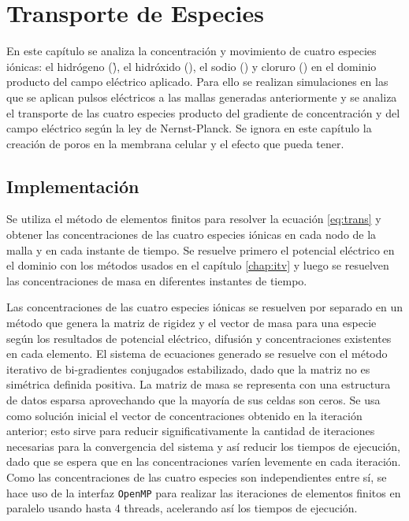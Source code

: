 \chapter{Transporte de Especies} \label{chap:trans}

En este capítulo se analiza la concentración y movimiento de cuatro especies iónicas: el hidrógeno (\h), el hidróxido (\oh), el sodio (\na) y cloruro (\cl) en el dominio producto del campo eléctrico aplicado. Para ello se realizan simulaciones en las que se aplican pulsos eléctricos a las mallas generadas anteriormente y se analiza el transporte de las cuatro especies producto del gradiente de concentración y del campo eléctrico según la ley de Nernst-Planck. Se ignora en este capítulo la creación de poros en la membrana celular y el efecto que pueda tener.

\section{Implementación}

Se utiliza el método de elementos finitos para resolver la ecuación \ref{eq:trans} y obtener las concentraciones de las cuatro especies iónicas en cada nodo de la malla y en cada instante de tiempo. Se resuelve primero el potencial eléctrico en el dominio con los métodos usados en el capítulo \ref{chap:itv} y luego se resuelven las concentraciones de masa en diferentes instantes de tiempo.

Las concentraciones de las cuatro especies iónicas se resuelven por separado en un método que genera la matriz de rigidez y el vector de masa para una especie según los resultados de potencial eléctrico, difusión y concentraciones existentes en cada elemento. El sistema de ecuaciones generado se resuelve con el método iterativo de bi-gradientes conjugados estabilizado, dado que la matriz no es simétrica definida positiva. La matriz de masa se representa con una estructura de datos esparsa aprovechando que la mayoría de sus celdas son ceros. Se usa como solución inicial el vector de concentraciones obtenido en la iteración anterior; esto sirve para reducir significativamente la cantidad de iteraciones necesarias para la convergencia del sistema y así reducir los tiempos de ejecución, dado que se espera que en las concentraciones varíen levemente en cada iteración. Como las concentraciones de las cuatro especies son independientes entre sí, se hace uso de la interfaz \texttt{OpenMP} para realizar las iteraciones de elementos finitos en paralelo usando hasta 4 threads, acelerando así los tiempos de ejecución.

